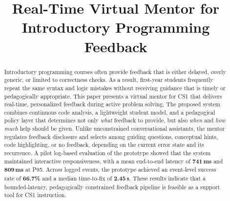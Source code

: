 \documentclass[conference]{IEEEtran}
\begin{document}
\title{Real-Time Virtual Mentor for Introductory Programming Feedback}

\author{
    \and
}

\maketitle

\begin{abstract}
Introductory programming courses often provide feedback that is either delayed, overly generic, or limited to correctness checks. As a result, first-year students frequently repeat the same syntax and logic mistakes without receiving guidance that is timely or pedagogically appropriate. This paper presents a virtual mentor for CS1 that delivers real-time, personalized feedback during active problem solving. The proposed system combines continuous code analysis, a lightweight student model, and a pedagogical policy layer that determines not only \emph{what} feedback to provide, but also \emph{when} and \emph{how much} help should be given. Unlike unconstrained conversational assistants, the mentor regulates feedback disclosure and selects among guiding questions, conceptual hints, code highlighting, or no feedback, depending on the current error state and its recurrence. A pilot log-based evaluation of the prototype showed that the system maintained interactive responsiveness, with a mean end-to-end latency of \textbf{741\,ms} and \textbf{809\,ms} at P95. Across logged events, the prototype achieved an event-level success rate of \textbf{66.7\%} and a median time-to-fix of \textbf{2.45\,s}. These results indicate that a bounded-latency, pedagogically constrained feedback pipeline is feasible as a support tool for CS1 instruction.
\end{abstract}
\end{document}
